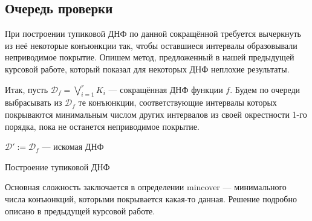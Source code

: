 \documentclass[12pt,a4paper,oneside,fleqn,leqno]{article}
\theoremstyle{definition}
\begin{document}
		\subsection{Очередь проверки}
			При построении тупиковой ДНФ по данной сокращённой требуется вычеркнуть из неё некоторые конъюнкции так, чтобы оставшиеся интервалы образовывали неприводимое покрытие. Опишем метод, предложенный в нашей предыдущей курсовой работе, который показал для некоторых ДНФ неплохие результаты.\par
			Итак, пусть $\mathcal{D}_f = \bigvee\limits_{i = 1}^r K_i$ --- сокращённая ДНФ функции $f$. Будем по очереди выбрасывать из $\mathcal{D}_f$ те конъюнкции, соответствующие интервалы которых покрываются минимальным числом других интервалов из своей окрестности 1-го порядка, пока не останется неприводимое покрытие.\par
			\begin{algorithm}[H]
				\SetAlgoLined
				$\mathcal{D}' \mathbin{:=} \mathcal{D}_f$ --- искомая ДНФ\;	
			\caption{Построение тупиковой ДНФ}
			\label{get_irred}
		\end{algorithm}\par
		Основная сложность заключается в определении mincover --- минимального числа конъюнкций, которыми покрывается какая-то данная. Решение подробно описано в предыдущей курсовой работе.
	\newpage
\end{document}
